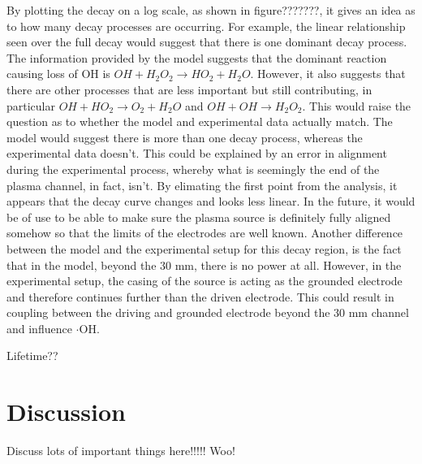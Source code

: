 \documentclass[11pt, oneside]{article}   	%
\begin{document}
By plotting the decay on a log scale, as shown in figure???????, it gives an idea as to how many decay processes are occurring. For example, the linear relationship seen over the full decay would suggest that there is one dominant decay process. 
The information provided by the model suggests that the dominant reaction causing loss of OH is $OH + H_2O_2 \rightarrow  HO_2 + H_2O$. However, it also suggests that there are other processes that are less important but still contributing, in particular $OH +HO_2 \rightarrow O_2 +H_2O$ and  $OH + OH \rightarrow H_2O_2$.
This would raise the question as to whether the model and experimental data actually match. The model would suggest there is more than one decay process, whereas the experimental data doesn't.
This could be explained by an error in alignment during the experimental process, whereby what is seemingly the end of the plasma channel, in fact, isn't. 
By elimating the first point from the analysis, it appears that the decay curve changes and looks less linear.
In the future, it would be of use to be able to make sure the plasma source is definitely fully aligned somehow so that the limits of the electrodes are well known.
Another difference between the model and the experimental setup for this decay region, is the fact that in the model, beyond the 30 mm, there is no power at all. However, in the experimental setup, the casing of the source is acting as the grounded electrode and therefore continues further than the driven electrode. This could result in coupling between the driving and grounded electrode beyond the 30 mm channel and influence $\cdot$OH.


Lifetime??





\section{Discussion}

Discuss lots of important things here!!!!! Woo!
\end{document}
